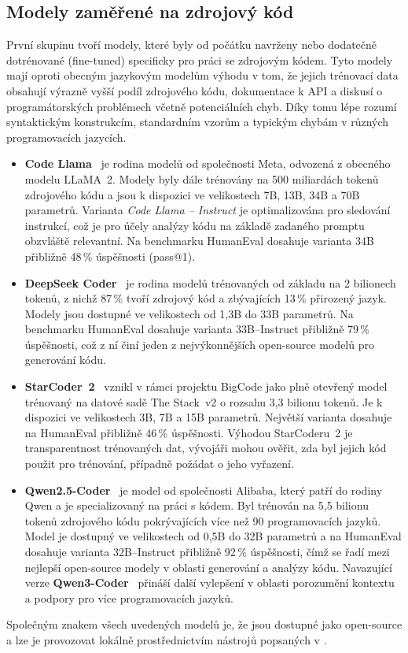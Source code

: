 \subsection{Modely zaměřené na zdrojový kód}
\label{subsec:models-code}

První skupinu tvoří modely, které byly od počátku navrženy nebo dodatečně dotrénované (fine-tuned) specificky pro práci se zdrojovým kódem.
Tyto modely mají oproti obecným jazykovým modelům výhodu v tom, že jejich trénovací data obsahují výrazně vyšší podíl zdrojového kódu, dokumentace k API a diskusí o programátorských problémech včetně potenciálních chyb.
Díky tomu lépe rozumí syntaktickým konstrukcím, standardním vzorům a typickým chybám v různých programovacích jazycích.

\begin{itemize}
    \item \textbf{Code Llama}~\cite{codellama} je rodina modelů od společnosti Meta, odvozená z obecného modelu LLaMA~2.
    Modely byly dále trénovány na 500 miliardách tokenů zdrojového kódu a jsou k dispozici ve velikostech 7B, 13B, 34B a 70B parametrů.
    Varianta \textit{Code Llama -- Instruct} je optimalizována pro sledování instrukcí, což je pro účely analýzy kódu na základě zadaného promptu obzvláště relevantní.
    Na benchmarku HumanEval dosahuje varianta 34B přibližně 48\,\% úspěšnosti (pass@1).

    \item \textbf{DeepSeek Coder}~\cite{deepseek-coder} je rodina modelů trénovaných od základu na 2 bilionech tokenů, z nichž 87\,\% tvoří zdrojový kód a zbývajících 13\,\% přirozený jazyk.
    Modely jsou dostupné ve velikostech od 1,3B do 33B parametrů.
    Na benchmarku HumanEval dosahuje varianta 33B--Instruct přibližně 79\,\% úspěšnosti, což z ní činí jeden z nejvýkonnějších open-source modelů pro generování kódu.

    \item \textbf{StarCoder~2}~\cite{starcoder2} vznikl v rámci projektu BigCode jako plně otevřený model trénovaný na datové sadě The Stack~v2 o rozsahu 3,3 bilionu tokenů.
    Je k dispozici ve velikostech 3B, 7B a 15B parametrů.
    Největší varianta dosahuje na HumanEval přibližně 46\,\% úspěšnosti.
    Výhodou StarCoderu~2 je transparentnost trénovaných dat, vývojáři mohou ověřit, zda byl jejich kód použit pro trénování, případně požádat o jeho vyřazení.

    \item \textbf{Qwen2.5-Coder}~\cite{qwen25-coder} je model od společnosti Alibaba, který patří do rodiny Qwen a je specializovaný na práci s kódem.
    Byl trénován na 5,5 bilionu tokenů zdrojového kódu pokrývajících více než 90 programovacích jazyků.
    Model je dostupný ve velikostech od 0,5B do 32B parametrů a na HumanEval dosahuje varianta 32B--Instruct přibližně 92\,\% úspěšnosti, čímž se řadí mezi nejlepší open-source modely v oblasti generování a analýzy kódu.
    Navazující verze \textbf{Qwen3-Coder}~\cite{qwen3-coder} přináší další vylepšení v oblasti porozumění kontextu a podpory pro více programovacích jazyků.
\end{itemize}

Společným znakem všech uvedených modelů je, že jsou dostupné jako open-source a lze je provozovat lokálně prostřednictvím nástrojů popsaných v .

\endinput